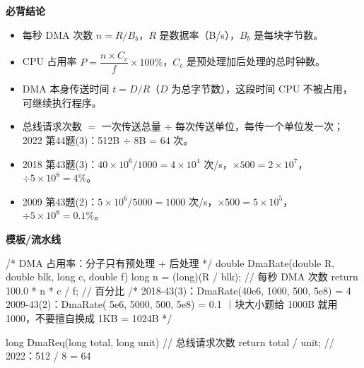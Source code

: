 \documentclass[10pt,a4paper]{ctexart}
\begin{document}




\textbf{必背结论}

\begin{itemize}

\item 每秒 DMA 次数 $n=R/B_b$，$R$ 是数据率（B/s），$B_b$ 是每块字节数。

\item CPU 占用率 $P=\dfrac{n\times C_c}{f}\times100\%$，$C_c$ 是预处理加后处理的总时钟数。

\item DMA 本身传送时间 $t=D/R$（$D$ 为总字节数），这段时间 CPU 不被占用，可继续执行程序。

\item 总线请求次数 $=$ 一次传送总量 $\div$ 每次传送单位，每传一个单位发一次；2022 第44题(3)：512B $\div$ 8B = 64 次。

\item 2018 第43题(3)：$40\times10^6/1000=4\times10^4$ 次/s，$\times500=2\times10^7$，$\div5\times10^8=4\%$。

\item 2009 第43题(2)：$5\times10^6/5000=1000$ 次/s，$\times500=5\times10^5$，$\div5\times10^8=0.1\%$。

\end{itemize}

\textbf{模板/流水线}

\begin{codebox}
/* DMA 占用率：分子只有预处理 + 后处理 */
double DmaRate(double R, double blk, long c, double f) {
    long n = (long)(R / blk);        // 每秒 DMA 次数
    return 100.0 * n * c / f;        // 百分比
}
/* 2018-43(3)：DmaRate(40e6, 1000, 500, 5e8) = 4%
   2009-43(2)：DmaRate( 5e6, 5000, 500, 5e8) = 0.1%
   ｜块大小题给 1000B 就用 1000，不要擅自换成 1KB = 1024B */

long DmaReq(long total, long unit) { // 总线请求次数
    return total / unit;             // 2022：512 / 8 = 64
}
\end{codebox}
\end{document}
